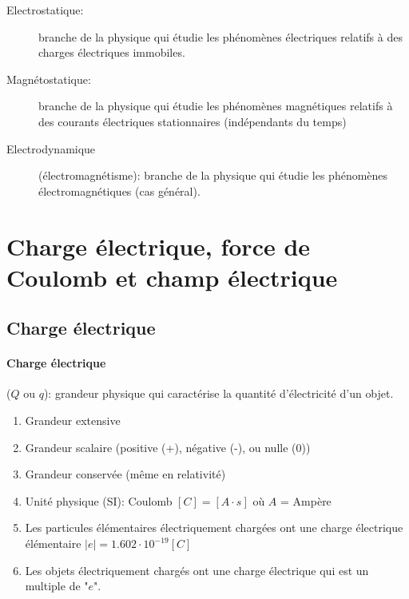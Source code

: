\documentclass[
    11pt,
    a4paper,
    oneside,
    headinlcude, footinclude,
    twoside,
]{report}
\begin{document}
\begin{description}
    \item[Electrostatique:] branche de la physique qui étudie les phénomènes électriques
        relatifs à des charges électriques immobiles.

    \item[Magnétostatique:] branche de la physique qui étudie les phénomènes magnétiques
        relatifs à des courants électriques stationnaires (indépendants du
        temps)

    \item[Electrodynamique] (électromagnétisme): branche de la physique qui étudie les phénomènes
        électromagnétiques (cas général).
\end{description}

\section{Charge électrique, force de Coulomb et champ électrique}
\label{sec:charge_electrique_force_de_coulomb_et_champ_electrique}

\subsection{Charge électrique}
\label{sub:charge_electrique}

\paragraph{Charge électrique}
\label{par:charge_electrique}

($Q$ ou $q$): grandeur physique qui caractérise la quantité d'électricité d'un
objet.



\begin{enumerate}
    \item Grandeur extensive

    \item Grandeur scalaire (positive (+), négative (-), ou nulle (0))

    \item Grandeur conservée (même en relativité)

    \item Unité physique (SI): Coulomb $[C] = [A \cdot s]$ où $A$ = Ampère

    \item Les particules élémentaires électriquement chargées ont une charge
        électrique élémentaire $|e| = 1.602 \cdot 10^{-19} [C]$

    \item Les objets électriquement chargés ont une charge électrique qui est
        un multiple de "$e$".
\end{enumerate}
\end{document}
